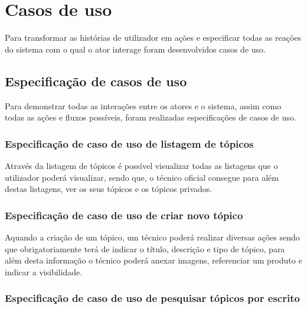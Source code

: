 \section{Casos de uso}
Para transformar as histórias de utilizador em ações e especificar todas as reações do sistema com o qual o ator interage foram desenvolvidos casos de uso.


\newpage

\subsection{Especificação de casos de uso}

Para demonstrar todas as interações entre os atores e o sistema, assim como todas as ações e fluxos possíveis, foram realizadas especificações de casos de uso.

\subsubsection{Especificação de caso de uso de listagem de tópicos}

Através da listagem de tópicos é possível visualizar todas as listagens que o utilizador poderá visualizar, sendo que, o técnico oficial consegue para além destas listagens, ver os seus tópicos e os tópicos privados.

%



\newpage

\subsubsection{Especificação de caso de uso de criar novo tópico}

Aquando a criação de um tópico, um técnico poderá realizar diversas ações sendo que obrigatoriamente terá de indicar o título, descrição e tipo de tópico, para além desta informação o técnico poderá anexar imagens, referenciar um produto e indicar a visibilidade.



\newpage

\subsubsection{Especificação de caso de uso de pesquisar tópicos por escrito}

